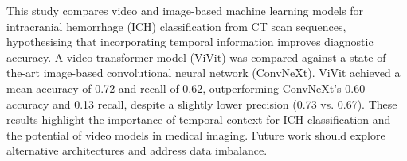This study compares video and image-based machine learning models for intracranial hemorrhage (ICH) classification from CT scan sequences, hypothesising that incorporating temporal information improves diagnostic accuracy. A video transformer model (ViVit) was compared against a state-of-the-art image-based convolutional neural network (ConvNeXt). ViVit achieved a mean accuracy of 0.72 and recall of 0.62, outperforming ConvNeXt's 0.60 accuracy and 0.13 recall, despite a slightly lower precision (0.73 vs. 0.67). These results highlight the importance of temporal context for ICH classification and the potential of video models in medical imaging. Future work should explore alternative architectures and address data imbalance.